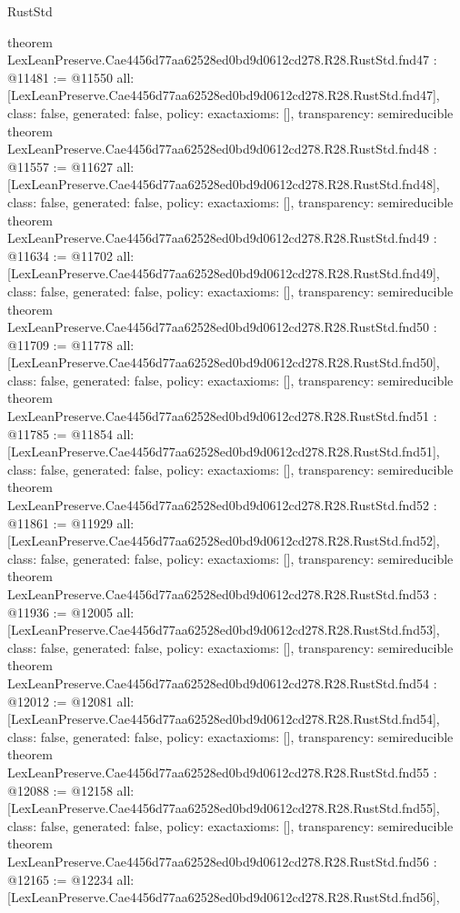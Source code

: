\begin{lexlean}{RustStd}
\begin{coremodule}
{}
theorem LexLeanPreserve.Cae4456d77aa62528ed0bd9d0612cd278.R28.RustStd.fnd47 : @11481 := @11550 {
  all: [LexLeanPreserve.Cae4456d77aa62528ed0bd9d0612cd278.R28.RustStd.fnd47],
  class: false,
  generated: false,
  policy: exact{axioms: []},
  transparency: semireducible
}
theorem LexLeanPreserve.Cae4456d77aa62528ed0bd9d0612cd278.R28.RustStd.fnd48 : @11557 := @11627 {
  all: [LexLeanPreserve.Cae4456d77aa62528ed0bd9d0612cd278.R28.RustStd.fnd48],
  class: false,
  generated: false,
  policy: exact{axioms: []},
  transparency: semireducible
}
theorem LexLeanPreserve.Cae4456d77aa62528ed0bd9d0612cd278.R28.RustStd.fnd49 : @11634 := @11702 {
  all: [LexLeanPreserve.Cae4456d77aa62528ed0bd9d0612cd278.R28.RustStd.fnd49],
  class: false,
  generated: false,
  policy: exact{axioms: []},
  transparency: semireducible
}
theorem LexLeanPreserve.Cae4456d77aa62528ed0bd9d0612cd278.R28.RustStd.fnd50 : @11709 := @11778 {
  all: [LexLeanPreserve.Cae4456d77aa62528ed0bd9d0612cd278.R28.RustStd.fnd50],
  class: false,
  generated: false,
  policy: exact{axioms: []},
  transparency: semireducible
}
theorem LexLeanPreserve.Cae4456d77aa62528ed0bd9d0612cd278.R28.RustStd.fnd51 : @11785 := @11854 {
  all: [LexLeanPreserve.Cae4456d77aa62528ed0bd9d0612cd278.R28.RustStd.fnd51],
  class: false,
  generated: false,
  policy: exact{axioms: []},
  transparency: semireducible
}
theorem LexLeanPreserve.Cae4456d77aa62528ed0bd9d0612cd278.R28.RustStd.fnd52 : @11861 := @11929 {
  all: [LexLeanPreserve.Cae4456d77aa62528ed0bd9d0612cd278.R28.RustStd.fnd52],
  class: false,
  generated: false,
  policy: exact{axioms: []},
  transparency: semireducible
}
theorem LexLeanPreserve.Cae4456d77aa62528ed0bd9d0612cd278.R28.RustStd.fnd53 : @11936 := @12005 {
  all: [LexLeanPreserve.Cae4456d77aa62528ed0bd9d0612cd278.R28.RustStd.fnd53],
  class: false,
  generated: false,
  policy: exact{axioms: []},
  transparency: semireducible
}
theorem LexLeanPreserve.Cae4456d77aa62528ed0bd9d0612cd278.R28.RustStd.fnd54 : @12012 := @12081 {
  all: [LexLeanPreserve.Cae4456d77aa62528ed0bd9d0612cd278.R28.RustStd.fnd54],
  class: false,
  generated: false,
  policy: exact{axioms: []},
  transparency: semireducible
}
theorem LexLeanPreserve.Cae4456d77aa62528ed0bd9d0612cd278.R28.RustStd.fnd55 : @12088 := @12158 {
  all: [LexLeanPreserve.Cae4456d77aa62528ed0bd9d0612cd278.R28.RustStd.fnd55],
  class: false,
  generated: false,
  policy: exact{axioms: []},
  transparency: semireducible
}
theorem LexLeanPreserve.Cae4456d77aa62528ed0bd9d0612cd278.R28.RustStd.fnd56 : @12165 := @12234 {
  all: [LexLeanPreserve.Cae4456d77aa62528ed0bd9d0612cd278.R28.RustStd.fnd56],
}
\end{coremodule}
\end{lexlean}
